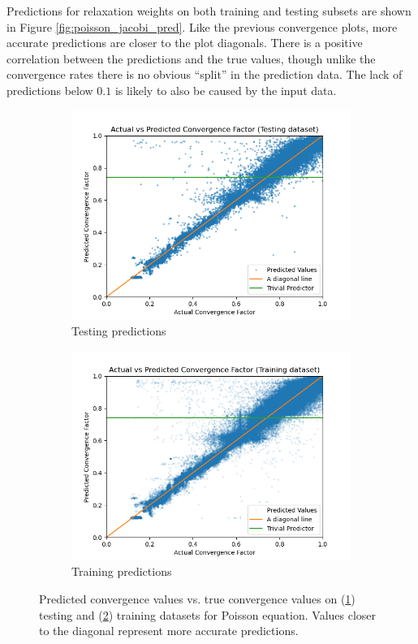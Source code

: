 \documentclass{siamart190516}
\begin{document}
Predictions for relaxation weights on both training and testing subsets are shown in Figure \ref{fig:poisson_jacobi_pred}.  Like the previous convergence plots, more accurate predictions are closer to the plot diagonals.  There is a positive correlation between the predictions and the true values, though unlike the convergence rates there is no obvious ``split'' in the prediction data.  The lack of predictions below $0.1$ is likely to also be caused by the input data.

\begin{figure}[h]
  \centering
  \begin{subfigure}{.48\textwidth}
    \includegraphics[width=\textwidth]{figs/poisson_conv_test_pred.png}
    \caption{Testing predictions}
    \label{subfig:poisson_conv_test}
  \end{subfigure}
  \begin{subfigure}{.48\textwidth}
    \includegraphics[width=\textwidth]{figs/poisson_conv_train_pred.png}
    \caption{Training predictions}
    \label{subfig:poisson_conv_train}
  \end{subfigure}
  \caption{Predicted convergence values vs. true convergence values on (\ref{subfig:poisson_conv_test}) testing and (\ref{subfig:poisson_conv_train}) training datasets for Poisson equation. Values closer to the diagonal represent more accurate predictions. }
  \label{fig:poisson_conv_pred}
\end{figure}
\end{document}
